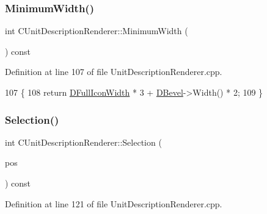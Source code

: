 \subsubsection{\texorpdfstring{Minimum\+Width()}{MinimumWidth()}}
{\footnotesize\ttfamily int C\+Unit\+Description\+Renderer\+::\+Minimum\+Width (\begin{DoxyParamCaption}{ }\end{DoxyParamCaption}) const}



Definition at line 107 of file Unit\+Description\+Renderer.\+cpp.


\begin{DoxyCode}
107                                                 \{
108     \textcolor{keywordflow}{return} \hyperlink{classCUnitDescriptionRenderer_a4bd79032fe13b9c09386a24cb8ef7650}{DFullIconWidth} * 3 + \hyperlink{classCUnitDescriptionRenderer_a9f4cd9f9d8dbc5036c885980494db41e}{DBevel}->Width() * 2;
109 \}
\end{DoxyCode}
\hypertarget{classCUnitDescriptionRenderer_a6ef0c9f010b5502def622e6d830795c7}{}\label{classCUnitDescriptionRenderer_a6ef0c9f010b5502def622e6d830795c7} 
\subsubsection{\texorpdfstring{Selection()}{Selection()}}
{\footnotesize\ttfamily int C\+Unit\+Description\+Renderer\+::\+Selection (\begin{DoxyParamCaption}\item[{const \hyperlink{classCPosition}{C\+Position} \&}]{pos }\end{DoxyParamCaption}) const}



Definition at line 121 of file Unit\+Description\+Renderer.\+cpp.


